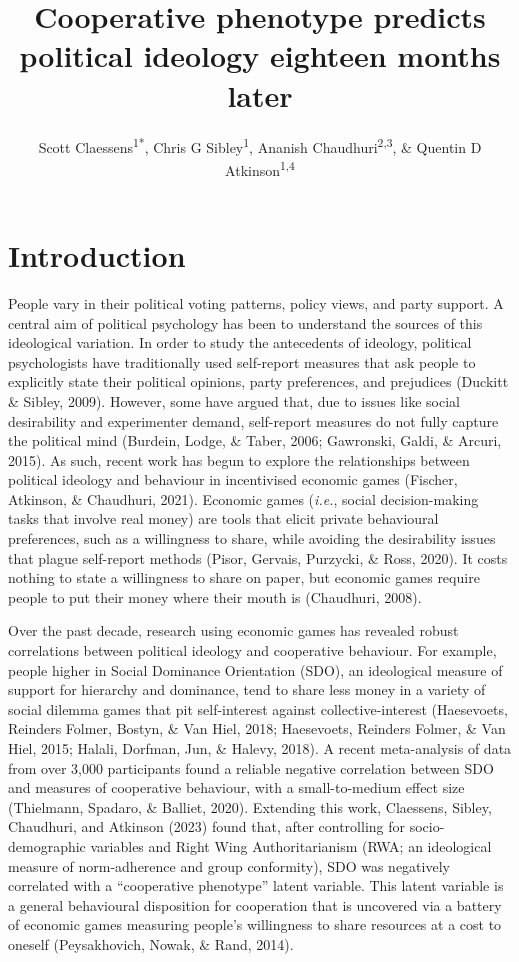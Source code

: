 \documentclass[
  man,floatsintext]{apa6}
\title{Cooperative phenotype predicts political ideology eighteen months later}
\author{Scott Claessens\textsuperscript{1*}, Chris G Sibley\textsuperscript{1}, Ananish Chaudhuri\textsuperscript{2,3}, \& Quentin D Atkinson\textsuperscript{1,4}}
\date{}
\affiliation{\vspace{0.5cm}\textsuperscript{1} \footnotesize School of Psychology, University of Auckland, Auckland, New Zealand\\\textsuperscript{2} \footnotesize Department of Economics, University of Auckland, Auckland, New Zealand\\\textsuperscript{3} \footnotesize CESifo, Munich, Germany\\\textsuperscript{4} \footnotesize Max Planck Institute for the Science of Human History, Jena, Germany}
\begin{document}
\maketitle

\linenumbers

\hypertarget{introduction}{%
\section{Introduction}\label{introduction}}

People vary in their political voting patterns, policy views, and party support. A central aim of political psychology has been to understand the sources of this ideological variation. In order to study the antecedents of ideology, political psychologists have traditionally used self-report measures that ask people to explicitly state their political opinions, party preferences, and prejudices (Duckitt \& Sibley, 2009). However, some have argued that, due to issues like social desirability and experimenter demand, self-report measures do not fully capture the political mind (Burdein, Lodge, \& Taber, 2006; Gawronski, Galdi, \& Arcuri, 2015). As such, recent work has begun to explore the relationships between political ideology and behaviour in incentivised economic games (Fischer, Atkinson, \& Chaudhuri, 2021). Economic games (\emph{i.e.}, social decision-making tasks that involve real money) are tools that elicit private behavioural preferences, such as a willingness to share, while avoiding the desirability issues that plague self-report methods (Pisor, Gervais, Purzycki, \& Ross, 2020). It costs nothing to state a willingness to share on paper, but economic games require people to put their money where their mouth is (Chaudhuri, 2008).

Over the past decade, research using economic games has revealed robust correlations between political ideology and cooperative behaviour. For example, people higher in Social Dominance Orientation (SDO), an ideological measure of support for hierarchy and dominance, tend to share less money in a variety of social dilemma games that pit self-interest against collective-interest (Haesevoets, Reinders Folmer, Bostyn, \& Van Hiel, 2018; Haesevoets, Reinders Folmer, \& Van Hiel, 2015; Halali, Dorfman, Jun, \& Halevy, 2018). A recent meta-analysis of data from over 3,000 participants found a reliable negative correlation between SDO and measures of cooperative behaviour, with a small-to-medium effect size (Thielmann, Spadaro, \& Balliet, 2020). Extending this work, Claessens, Sibley, Chaudhuri, and Atkinson (2023) found that, after controlling for socio-demographic variables and Right Wing Authoritarianism (RWA; an ideological measure of norm-adherence and group conformity), SDO was negatively correlated with a ``cooperative phenotype'' latent variable. This latent variable is a general behavioural disposition for cooperation that is uncovered via a battery of economic games measuring people's willingness to share resources at a cost to oneself (Peysakhovich, Nowak, \& Rand, 2014).
\end{document}
